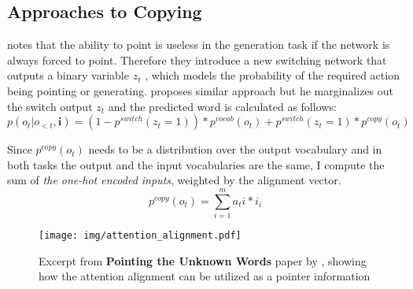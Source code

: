 \subsection{Approaches to Copying}

\citep{gulcehre2016pointing} notes that the ability to point is useless in the generation task if the network is always forced to point. Therefore they introduce a new switching network that outputs a binary variable $z_t$ , which models the probability of the required action being pointing or generating. \citep{yang2016referenceaware} proposes similar approach but he marginalizes out the switch output $z_t$ and the predicted word is calculated as follows:
\begin{equation}
    p(o_t | o_{<t}, \mathbf{i}) = ( 1 - p^{switch}(z_t = 1)) * p^{vocab}(o_t) + p^{switch}(z_t = 1) * p^{copy}(o_t)
\end{equation}

Since $p^{copy}(o_t)$ needs to be a distribution over the output vocabulary and in both tasks the output and the input vocabularies are the same, I compute the sum of \emph{the one-hot encoded inputs}, weighted by the alignment vector.
\begin{equation}
    p^{copy}(o_t) = \sum_{i=1}^m{a_ti * i_i}
\end{equation}

\begin{figure}
    \texttt{[image: img/attention\_alignment.pdf]}
    \caption{Excerpt from \textbf{Pointing the Unknown Words} paper by \citep{gulcehre2016pointing}, showing how the attention alignment can be utilized as a pointer information}
\end{figure}